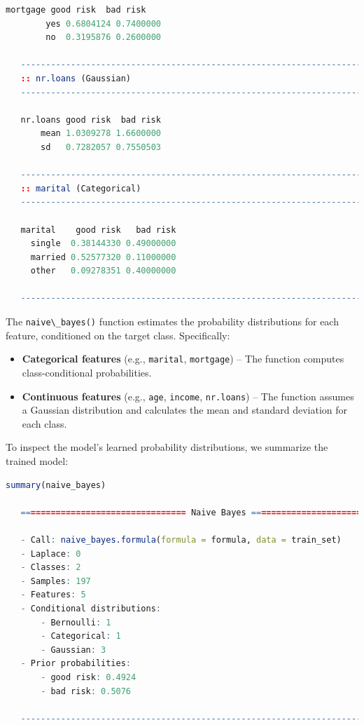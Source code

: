 \documentclass[
]{book}
\newcommand{\passthrough}[1]{#1}
\providecommand{\tightlist}{%
  \setlength{\itemsep}{0pt}\setlength{\parskip}{0pt}}
\theoremstyle{definition}
\theoremstyle{definition}
\theoremstyle{definition}
\theoremstyle{definition}
\theoremstyle{remark}
\begin{document}
\begin{lstlisting}[language=R]
   mortgage good risk  bad risk
        yes 0.6804124 0.7400000
        no  0.3195876 0.2600000
   
   -------------------------------------------------------------------------------- 
   :: nr.loans (Gaussian) 
   -------------------------------------------------------------------------------- 
           
   nr.loans good risk  bad risk
       mean 1.0309278 1.6600000
       sd   0.7282057 0.7550503
   
   -------------------------------------------------------------------------------- 
   :: marital (Categorical) 
   -------------------------------------------------------------------------------- 
            
   marital    good risk   bad risk
     single  0.38144330 0.49000000
     married 0.52577320 0.11000000
     other   0.09278351 0.40000000
   
   --------------------------------------------------------------------------------
\end{lstlisting}

The \passthrough{\lstinline!naive\_bayes()!} function estimates the probability distributions for each feature, conditioned on the target class. Specifically:

\begin{itemize}
\tightlist
\item
  \textbf{Categorical features} (e.g., \passthrough{\lstinline!marital!}, \passthrough{\lstinline!mortgage!}) -- The function computes class-conditional probabilities.\\
\item
  \textbf{Continuous features} (e.g., \passthrough{\lstinline!age!}, \passthrough{\lstinline!income!}, \passthrough{\lstinline!nr.loans!}) -- The function assumes a Gaussian distribution and calculates the mean and standard deviation for each class.
\end{itemize}

To inspect the model's learned probability distributions, we summarize the trained model:

\begin{lstlisting}[language=R]
summary(naive_bayes)
   
   ================================= Naive Bayes ================================== 
    
   - Call: naive_bayes.formula(formula = formula, data = train_set) 
   - Laplace: 0 
   - Classes: 2 
   - Samples: 197 
   - Features: 5 
   - Conditional distributions: 
       - Bernoulli: 1
       - Categorical: 1
       - Gaussian: 3
   - Prior probabilities: 
       - good risk: 0.4924
       - bad risk: 0.5076
   
   --------------------------------------------------------------------------------
\end{lstlisting}
\end{document}
